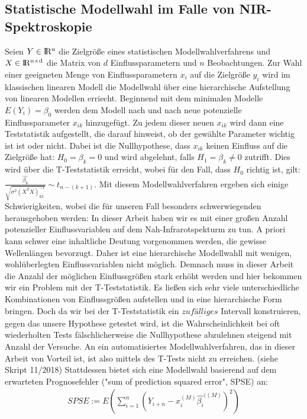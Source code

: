 	\subsection{Statistische Modellwahl im Falle von NIR-Spektroskopie}
	\label{ssec:mlr}
	Seien $Y\in \rm I\!R^{n}$ die Zielgröße eines statistischen Modellwahlverfahrens und $X \in \rm I\!R^{n \times d}$ die Matrix von $d$ Einflussparametern und $n$ Beobachtungen. 
	Zur Wahl einer geeigneten Menge von Einflussparametern $x_i$ auf die Zielgröße $y_i$  wird im klassischen linearen Modell die Modellwahl über eine hierarchische Aufstellung von linearen Modellen erriecht. Beginnend mit dem minimalen Modelle $E(Y_i) = \beta_0$ werden dem Modell nach und nach neue potenzielle Einflussparameter $x_{ik}$ hinzugefügt. Zu jedem dieser neuen $x_{ik}$ wird dann eine Teststatistik aufgestellt, die darauf hinweist, ob der gewählte Parameter wichtig ist ist oder nicht. Dabei ist die Nullhypothese, dass $x_{ik}$ keinen Einfluss auf die Zielgröße hat: $ H_0 = \beta_k = 0$ und wird abgelehnt, falls $H_1 = \beta_k \neq 0$ zutrifft. 
	Dies wird über die T-Teststatistik erreicht,  wobei für den Fall, dass $H_0$ richtig ist, gilt: $\frac{\hat{\beta_k}}{\sqrt{\sigma^2(X^TX)^{-1}_{kk}}} \sim t_{n-(k+1)}$.
	Mit diesem Modellwahlverfahren ergeben sich einige Schwierigkeiten, wobei die für unseren Fall besonders schwerwiegenden herausgehoben werden: In dieser Arbeit haben wir es mit einer großen Anzahl potenzieller Einflussvariablen auf dem Nah-Infrarotspekturm zu tun. A priori kann schwer eine inhaltliche Deutung vorgenommen werden, die gewisse Wellenlängen bevorzugt. Daher ist eine hierarchische Modellwahll mit wenigen, wohlüberlegten Einflussvariablen nicht möglich. Demnach muss in dieser Arbeit die Anzahl der möglichen Einflussgrößen stark erhöht werden und hier bekommen wir ein Problem mit der T-Teststatistik. Es ließen sich sehr viele unterschiedliche Kombinationen von Einflussgrößen aufstellen und in eine hierarchische Form bringen. Doch da wir bei der T-Teststatistik ein $\underline{zufälliges}$ Intervall konstruieren, gegen das unsere Hypothese getestet wird, ist die Wahrscheinlichkeit bei oft wiederholten Tests fälschlicherweise die Nullhypothese abzulehnen steigend mit Anzahl der Versuche. An ein automatisiertes Modellwahlverfahren, das in dieser Arbeit von Vorteil ist, ist also mittels des T-Tests nicht zu erreichen. (siehe Skript 11/2018)
	Stattdessen bietet sich eine Modellwahl basierend auf dem erwarteten Prognosefehler ("sum of prediction squared error", SPSE) an: 
	\begin{align}
		SPSE := E(\sum_{i=1}^{n} (Y_{i+n} - x_{i}^{(M)}\hat{\beta_i}^{((M)})^2)
	\end{align}
	
